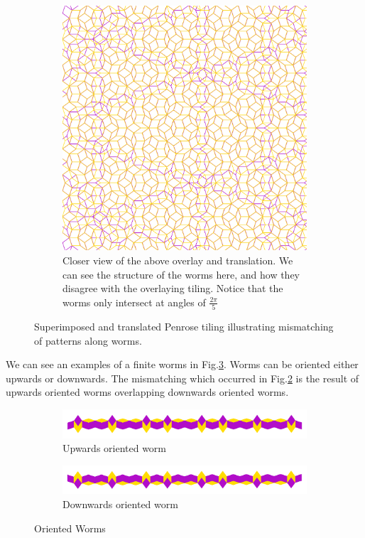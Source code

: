 \documentclass[
  oneside,
  11pt, a4paper,
  footinclude=true,
  headinclude=true,
  cleardoublepage=empty
]{scrbook}
\begin{document}
\begin{figure}[H]
\begin{subfigure}{0.6\textwidth}
\includegraphics[width=\textwidth]{TranslateClose}
\caption{Closer view of the above overlay and translation. We can see the structure of the worms here, and how they disagree with the overlaying tiling. Notice that the worms only intersect at angles of $\frac{2\pi}{5}$}
\label{fig:close}
\end{subfigure}
\caption{Superimposed and translated Penrose tiling illustrating mismatching of patterns along worms.}
\label{fig:translations}
\end{figure}

We can see an examples of a finite worms in Fig.\ref{fig:worm}. Worms can be oriented either upwards or downwards. The mismatching which occurred in Fig.\ref{fig:translations} is the result of upwards oriented worms overlapping downwards oriented worms. 


\begin{figure}[H]
\centering
\begin{subfigure}{\textwidth}
\centering
\includegraphics[width=\textwidth]{Worm}
\caption{Upwards oriented worm}
\end{subfigure}

\begin{subfigure}{\textwidth}
\centering
\includegraphics[width=\textwidth]{WormDown}
\caption{Downwards oriented worm}
\end{subfigure}

\caption{Oriented Worms}
\label{fig:worm}
\end{figure}
\end{document}
